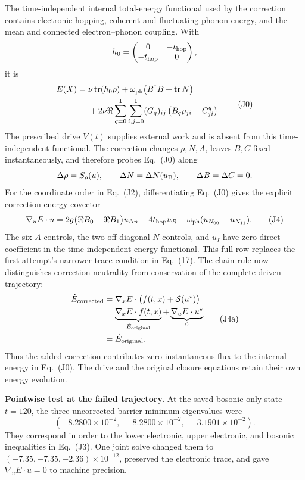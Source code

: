 \documentclass[10pt,letterpaper,twocolumn]{article}
\begin{document}
The time-independent internal total-energy functional used by the correction
contains electronic hopping, coherent and fluctuating phonon energy, and the
mean and connected electron--phonon coupling.  With
\[
h_0=
\begin{pmatrix}0&-t_{\rm hop}\\-t_{\rm hop}&0\end{pmatrix},
\]
it is
{\small
\[
\begin{aligned}
E(X)={}&\nu\operatorname{tr}(h_0\rho)
+\omega_{\rm ph}\bigl(B^\dagger B+\operatorname{tr}N\bigr)\\
&+2\nu\Re\sum_{q=0}^{1}\sum_{i,j=0}^{1}(G_q)_{ij}
\left(B_q\rho_{ji}+C^q_{ji}\right).
\end{aligned}
\tag{J0}
\]
}
The prescribed drive \(V(t)\) supplies external work and is absent from this
time-independent functional.  The correction changes \(\rho,N,A\), leaves
\(B,C\) fixed instantaneously, and therefore probes Eq.~(J0) along
\[
\Delta\rho=S_\rho(u),\qquad
\Delta N=\Delta N(u_{\rm B}),\qquad
\Delta B=\Delta C=0.
\]
For the coordinate order in Eq.~(J2), differentiating Eq.~(J0) gives the
explicit correction-energy covector
\[
\nabla_u E\cdot u
=2g\bigl(\Re B_0-\Re B_1\bigr)u_{\Delta n}
-4t_{\rm hop}u_R
+\omega_{\rm ph}(u_{N_{00}}+u_{N_{11}}).
\tag{J4}
\]
The six \(A\) controls, the two off-diagonal \(N\) controls, and \(u_I\) have
zero direct coefficient in the time-independent energy functional.  This full
row replaces the first attempt's narrower trace condition in Eq.~(17).
The chain rule now distinguishes correction neutrality from conservation of
the complete driven trajectory:
\[
\begin{aligned}
\dot E_{\rm corrected}
&=\nabla_xE\cdot\bigl(f(t,x)+\mathcal S(u^\star)\bigr)\\
&=\underbrace{\nabla_xE\cdot f(t,x)}_{\dot E_{\rm original}}
 +\underbrace{\nabla_uE\cdot u^\star}_{0}\\
&=\dot E_{\rm original}.
\end{aligned}
\tag{J4a}
\]
Thus the added correction contributes zero instantaneous flux to the internal
energy in Eq.~(J0).  The drive and the original closure equations retain their
own energy evolution.

\textbf{Pointwise test at the failed trajectory.}
At the saved bosonic-only state \(t=120\), the three uncorrected barrier
minimum eigenvalues were
\[
(-8.2800\times10^{-2},\ -8.2800\times10^{-2},\
 -3.1901\times10^{-2}).
\]
They correspond in order to the lower electronic, upper electronic, and
bosonic inequalities in Eq.~(J3).  One joint solve changed them to
\((-7.35,-7.35,-2.36)\times10^{-12}\), preserved the electronic trace, and
gave \(\nabla_uE\cdot u=0\) to machine precision.
\end{document}
